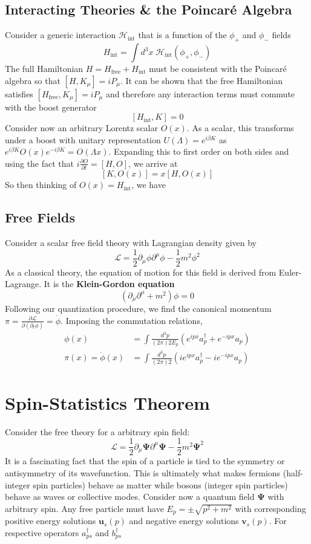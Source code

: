 \documentclass[onecolumn]{gwclass}
\def \*#1{\boldsymbol{#1}}
\renewcommand{\t}[1]{\text{#1}}
\begin{document}
\subsection{Interacting Theories \& the Poincar\'e Algebra}
Consider a generic interaction $\mathscr{H}_\t{int}$ that is a function of the $\phi_+$ and $\phi_-$ fields
$$ H_\t{int} = \int d^3x\;\mathscr{H}_\t{int}(\phi_+, \phi_-)$$
The full Hamiltonian $H=H_\t{free}+H_\t{int}$ must be consistent with the Poincar\'e algebra so that $[H, K_\mu] = iP_\mu$. It can be shown that the free Hamiltonian satisfies $[H_\t{free}, K_\mu]=iP_\mu$ and therefore any interaction terms must commute with the boost generator
$$ [H_\t{int},K]=0 $$
Consider now an arbitrary Lorentz scalar $O(x)$. As a scalar, this transforms under a boost with unitary representation $U(\Lambda)=e^{i\beta K}$ as $ e^{i\beta K}O(x)e^{-i\beta K} = O(\Lambda x) $.
Expanding this to first order on both sides and using the fact that $i\frac{\partial O}{\partial t} = [H,O]$, we arrive at
$$[K, O(x)] = x[H, O(x)]$$
So then thinking of $O(x)=H_\t{int}$, we have

\subsection{Free Fields}
Consider a scalar free field theory with Lagrangian density given by
$$ \mathscr{L} = \frac{1}{2}\partial_\mu\phi \partial^\mu\phi - \frac{1}{2}m^2\phi^2 $$
As a classical theory, the equation of motion for this field is derived from Euler-Lagrange. It is the \textbf{Klein-Gordon equation}
$$ (\partial_\mu\partial^\mu + m^2)\phi= 0 $$
Following our quantization procedure, we find the canonical momentum $ \pi = \frac{\partial\mathscr{L}}{\partial(\partial_t \phi)}= \dot\phi $. Imposing the commutation relations,
\begin{align*}
	\phi(x) &= \int\frac{d^3p}{(2\pi)2E_p}(e^{ipx}a_p^\dagger + e^{-ipx}a_p) \\
	\pi(x) =\dot\phi(x) &= \int\frac{d^3p}{(2\pi)2}(ie^{ipx}a_p^\dagger - ie^{-ipx}a_p) 
\end{align*}


\section{Spin-Statistics Theorem}
Consider the free theory for a arbitrary spin field:
$$ \mathscr{L} = \frac{1}{2}\partial_\mu\*\Psi\partial^\mu\*\Psi - \frac{1}{2}m^2\*\Psi^2 $$
$$  $$
It is a fascinating fact that the spin of a particle is tied to the symmetry or antisymmetry of its wavefunction. This is ultimately what makes fermions (half-integer spin particles) behave as matter while bosons (integer spin particles) behave as waves or collective modes. Consider now a quantum field $\*\Psi$ with arbitrary spin. Any free particle must have $E_p = \pm \sqrt{p^2 + m^2}$ with corresponding positive energy solutions $\*u_s(p)$ and negative energy solutions $\*v_s(p)$. For respective operators $a_{ps}^\dagger$ and $b_{ps}^\dagger$
\end{document}
